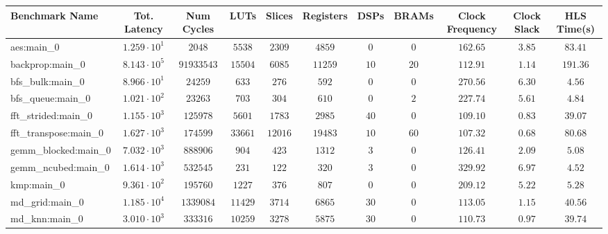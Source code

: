\begin{tabular}{|l|c|c|c|c|c|c|c|c|c|c|}
\hline
Benchmark Name         & Tot. Latency           & Num Cycles   & LUTs       & Slices    & Registers & DSPs    & BRAMs  & Clock Frequency & Clock Slack & HLS Time(s) \\
\hline
aes:main\_0            & $ 1.259 \cdot 10^{1} $ & $ 2048     $ & $ 5538   $ & $ 2309  $ & $ 4859  $ & $ 0   $ & $ 0  $ & $ 162.65      $ & $ 3.85    $ & $ 83.41   $ \\
backprop:main\_0       & $ 8.143 \cdot 10^{5} $ & $ 91933543 $ & $ 15504  $ & $ 6085  $ & $ 11259 $ & $ 10  $ & $ 20 $ & $ 112.91      $ & $ 1.14    $ & $ 191.36  $ \\
bfs\_bulk:main\_0      & $ 8.966 \cdot 10^{1} $ & $ 24259    $ & $ 633    $ & $ 276   $ & $ 592   $ & $ 0   $ & $ 0  $ & $ 270.56      $ & $ 6.30    $ & $ 4.56    $ \\
bfs\_queue:main\_0     & $ 1.021 \cdot 10^{2} $ & $ 23263    $ & $ 703    $ & $ 304   $ & $ 610   $ & $ 0   $ & $ 2  $ & $ 227.74      $ & $ 5.61    $ & $ 4.84    $ \\
fft\_strided:main\_0   & $ 1.155 \cdot 10^{3} $ & $ 125978   $ & $ 5601   $ & $ 1783  $ & $ 2985  $ & $ 40  $ & $ 0  $ & $ 109.10      $ & $ 0.83    $ & $ 39.07   $ \\
fft\_transpose:main\_0 & $ 1.627 \cdot 10^{3} $ & $ 174599   $ & $ 33661  $ & $ 12016 $ & $ 19483 $ & $ 10  $ & $ 60 $ & $ 107.32      $ & $ 0.68    $ & $ 80.68   $ \\
gemm\_blocked:main\_0  & $ 7.032 \cdot 10^{3} $ & $ 888906   $ & $ 904    $ & $ 423   $ & $ 1312  $ & $ 3   $ & $ 0  $ & $ 126.41      $ & $ 2.09    $ & $ 5.08    $ \\
gemm\_ncubed:main\_0   & $ 1.614 \cdot 10^{3} $ & $ 532545   $ & $ 231    $ & $ 122   $ & $ 320   $ & $ 3   $ & $ 0  $ & $ 329.92      $ & $ 6.97    $ & $ 4.52    $ \\
kmp:main\_0            & $ 9.361 \cdot 10^{2} $ & $ 195760   $ & $ 1227   $ & $ 376   $ & $ 807   $ & $ 0   $ & $ 0  $ & $ 209.12      $ & $ 5.22    $ & $ 5.28    $ \\
md\_grid:main\_0       & $ 1.185 \cdot 10^{4} $ & $ 1339084  $ & $ 11429  $ & $ 3714  $ & $ 6865  $ & $ 30  $ & $ 0  $ & $ 113.05      $ & $ 1.15    $ & $ 40.56   $ \\
md\_knn:main\_0        & $ 3.010 \cdot 10^{3} $ & $ 333316   $ & $ 10259  $ & $ 3278  $ & $ 5875  $ & $ 30  $ & $ 0  $ & $ 110.73      $ & $ 0.97    $ & $ 39.74   $ \\

\end{tabular}
